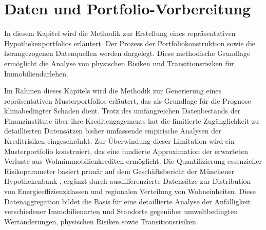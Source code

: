\section{Daten und Portfolio-Vorbereitung}

In diesem Kapitel wird die Methodik zur Erstellung eines repräsentativen Hypothekenportfolios erläutert. Der Prozess der Portfoliokonstruktion sowie die herangezogenen Datenquellen werden dargelegt. Diese methodische Grundlage ermöglicht die Analyse von physischen Risiken und Transitionsrisiken für Immobiliendarlehen.

Im Rahmen dieses Kapitels wird die Methodik zur Generierung eines repräsentativen Musterportfolios erläutert, das als Grundlage für die Prognose klimabedingter Schäden dient. Trotz des umfangreichen Datenbestands der Finanzinstitute über ihre Kreditengagements hat die limitierte Zugänglichkeit zu detaillierten Datensätzen bisher umfassende empirische Analysen der Kreditrisiken eingeschränkt. Zur Überwindung dieser Limitation wird ein Musterportfolio konstruiert, das eine fundierte Approximation der erwarteten Verluste aus Wohnimmobilienkrediten ermöglicht. Die Quantifizierung essenzieller Risikoparameter basiert primär auf dem Geschäftsbericht der Münchener Hypothekenbank \parencite{MuenchenerHyp2023}, ergänzt durch ausdifferenzierte Datensätze zur Distribution von Energieeffizienzklassen und regionalen Verteilung von Wohneinheiten. Diese Datenaggregation bildet die Basis für eine detaillierte Analyse der Anfälligkeit verschiedener Immobilienarten und Standorte gegenüber umweltbedingten Wertänderungen, physischen Risiken sowie Transitionsrisiken.





